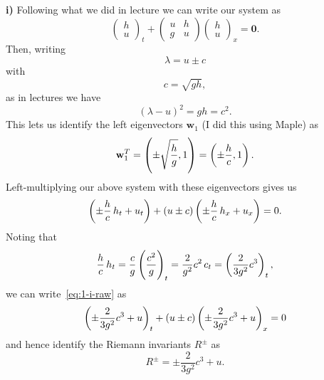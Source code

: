 \documentclass{article}
\def\*#1{\mathbf{#1}}
\begin{document}
\textbf{i)} Following what we did in lecture we can write our system as
%
\begin{equation*}
    \begin{pmatrix}
        h \\
        u
    \end{pmatrix}_t
    +
    \begin{pmatrix}
        u & h \\
        g & u
    \end{pmatrix}
    \begin{pmatrix}
        h \\
        u
    \end{pmatrix}_x
    = \*0
    .
\end{equation*}
%
Then, writing
%
\begin{equation*}
    \lambda = u \pm c
\end{equation*}
%
with
%
\begin{equation*}
    c = \sqrt{g h}
    ,
\end{equation*}
%
as in lectures we have
%
\begin{equation*}
    (\lambda - u)^2 = g h = c^2
    .
\end{equation*}
%
This lets us identify the left eigenvectors $\*w_1$ (I did this using
Maple) as
%
\begin{equation*}
    \*w_1^T
    = \del{\pm \sqrt{\frac{h}{g}}, 1}
    = \del{\pm \frac{h}{c}, 1}
    .
\end{equation*}
%
Left-multiplying our above system with these eigenvectors gives us
%
\begin{equation}
    \del{\pm \frac{h}{c} \, h_t + u_t} + (u \pm c) \del{\pm \frac{h}{c} \, h_x + u_x} = 0
    \label{eq:1-i-raw}
    .
\end{equation}
%
Noting that
%
\begin{equation*}
    \frac{h}{c}\, h_t
    = \frac{c}{g} \del{\frac{c^2}{g}}_t
    = \frac{2}{g^2} c^2 \, c_t
    = \del{\frac{2}{3 g^2} c^3}_t
    ,
\end{equation*}
%
we can write~\eqref{eq:1-i-raw} as
%
\begin{equation*}
    \del{\pm \frac{2}{3 g^2} c^3 + u}_t + (u \pm c) \del{\pm \frac{2}{3 g^2} c^3 + u}_x = 0
\end{equation*}
%
and hence identify the Riemann invariants $R^\pm$ as
%
\begin{equation*}
    R^\pm = \pm \frac{2}{3 g^2} c^3 + u
    .
\end{equation*}
\end{document}

